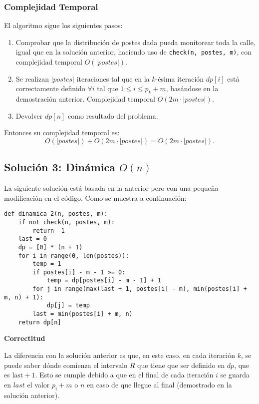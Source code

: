 \documentclass{article}
\begin{document}
\subsubsection{Complejidad Temporal}
El algoritmo sigue los siguientes pasos:
\begin{enumerate}
    \item Comprobar que la distribución de postes dada pueda monitorear toda la calle, igual que en la solución anterior, haciendo uso de \texttt{check(n, postes, m)}, con complejidad temporal \( O(|postes|) \).
    \item Se realizan \( |postes| \) iteraciones tal que en la \( k \)-ésima iteración \( dp[i] \) está correctamente definido \( \forall i \) tal que \( 1 \leq i \leq p_k + m \), basándose en la demostración anterior. Complejidad temporal \( O(2m \cdot |postes|) \).
    \item Devolver \( dp[n] \) como resultado del problema.
\end{enumerate}

Entonces su complejidad temporal es:
\[
O(|postes|) + O(2m \cdot |postes|) = O(2m \cdot |postes|).
\]



 \subsection{Solución 3: Dinámica \( O(n) \)}

La siguiente solución está basada en la anterior pero con una pequeña modificación en el código. Como se muestra a continuación:

\begin{verbatim}
def dinamica_2(n, postes, m):
    if not check(n, postes, m):
        return -1
    last = 0
    dp = [0] * (n + 1)
    for i in range(0, len(postes)):
        temp = 1
        if postes[i] - m - 1 >= 0:
            temp = dp[postes[i] - m - 1] + 1
        for j in range(max(last + 1, postes[i] - m), min(postes[i] + m, n) + 1):
            dp[j] = temp
        last = min(postes[i] + m, n)
    return dp[n]
\end{verbatim}

\textbf{Correctitud}

La diferencia con la solución anterior es que, en este caso, en cada iteración \( k \), se puede saber dónde comienza el intervalo \( R \) que tiene que ser definido en \( dp \), que es \( \text{last} + 1 \). Esto se cumple debido a que en el final de cada iteración \( i \) se guarda en \( last \) el valor \( p_i + m \) o \( n \) en caso de que llegue al final (demostrado en la solución anterior).
\end{document}

